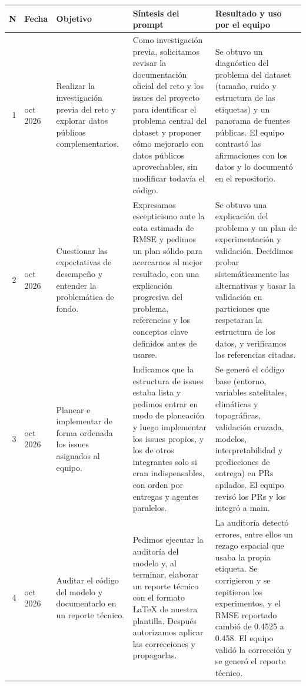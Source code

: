 \documentclass[10pt,letterpaper]{article}
\begin{document}
\begin{longtable}{@{}r >{\raggedright\arraybackslash}p{1.2cm} >{\raggedright\arraybackslash}p{2.7cm} >{\raggedright\arraybackslash}p{4.1cm} >{\raggedright\arraybackslash}p{4.5cm}@{}}
\toprule
N & Fecha & Objetivo & Síntesis del prompt & Resultado y uso por el equipo \\
\midrule
\endhead
1 & 4 oct 2026 & Realizar la investigación previa del reto y explorar datos públicos complementarios. & Como investigación previa, solicitamos revisar la documentación oficial del reto y los issues del proyecto para identificar el problema central del dataset y proponer cómo mejorarlo con datos públicos aprovechables, sin modificar todavía el código. & Se obtuvo un diagnóstico del problema del dataset (tamaño, ruido y estructura de las etiquetas) y un panorama de fuentes públicas. El equipo contrastó las afirmaciones con los datos y lo documentó en el repositorio. \\
2 & 4 oct 2026 & Cuestionar las expectativas de desempeño y entender la problemática de fondo. & Expresamos escepticismo ante la cota estimada de RMSE y pedimos un plan sólido para acercarnos al mejor resultado, con una explicación progresiva del problema, referencias y los conceptos clave definidos antes de usarse. & Se obtuvo una explicación del problema y un plan de experimentación y validación. Decidimos probar sistemáticamente las alternativas y basar la validación en particiones que respetaran la estructura de los datos, y verificamos las referencias citadas. \\
3 & 5 oct 2026 & Planear e implementar de forma ordenada los issues asignados al equipo. & Indicamos que la estructura de issues estaba lista y pedimos entrar en modo de planeación y luego implementar los issues propios, y los de otros integrantes solo si eran indispensables, con orden por entregas y agentes paralelos. & Se generó el código base (entorno, variables satelitales, climáticas y topográficas, validación cruzada, modelos, interpretabilidad y predicciones de entrega) en PRs apilados. El equipo revisó los PRs y los integró a main. \\
4 & 7 oct 2026 & Auditar el código del modelo y documentarlo en un reporte técnico. & Pedimos ejecutar la auditoría del modelo y, al terminar, elaborar un reporte técnico con el formato LaTeX de nuestra plantilla. Después autorizamos aplicar las correcciones y propagarlas. & La auditoría detectó errores, entre ellos un rezago espacial que usaba la propia etiqueta. Se corrigieron y se repitieron los experimentos, y el RMSE reportado cambió de 0.4525 a 0.458. El equipo validó la corrección y se generó el reporte técnico. \\

\end{longtable}
\end{document}
